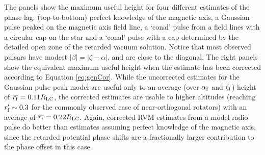 The panels show the maximum useful height for
four different estimates of the phase lag: (top-to-bottom) perfect knowledge of
the magnetic axis, a Gaussian pulse peaked on the magnetic axis field line, a 
`conal' pulse from a field lines with a circular cap on the star and a `conal' pulse with
a cap determined by the detailed open zone of the retarded vacuum solution. 
Notice that most observed pulsars have modest $|\beta|=|\zeta-\alpha|$, and 
are close to the diagonal.
The right panels show the equivalent maximum useful height when the
estimate has been corrected according to Equation \ref{eq:genCor}. While the uncorrected
estimates for the Gaussian pulse peak model are useful 
only to an average (over $\alpha_{\rm{f}}$ and $\zeta_{\rm{f}}$) height of $\overline{r_{\rm{f}}}=0.11R_{\rm{LC}}$, the corrected
estimates are usable to higher altitudes (reaching $r_{\rm{f}}'\sim 0.3$ for the commonly
observed case of near-orthogonal rotators) with an average of $\overline{r_{\rm{f}}}=0.22R_{\rm{LC}}$.
Again, corrected
RVM estimates from a model radio pulse do better than estimates
assuming perfect knowledge of the magnetic axis, since the retarded potential
phase shifts are a fractionally larger contribution to the phase offset in this
case. 
